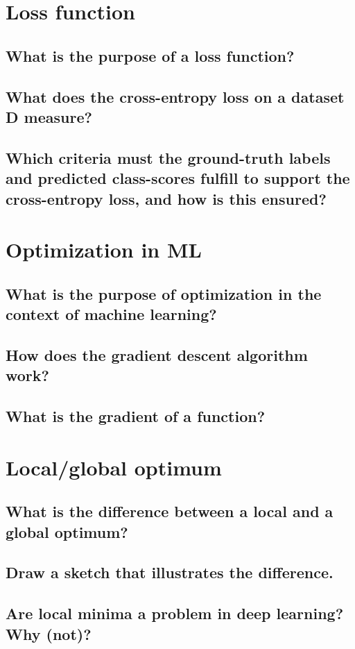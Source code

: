 \section{Loss function}
\subsection{What is the purpose of a loss function?}
\subsection{What does the cross-entropy loss on a dataset D measure?}
\subsection{Which criteria must the ground-truth labels and predicted class-scores fulfill to support the cross-entropy loss, and how is this ensured?}

\section{Optimization in ML}
\subsection{What is the purpose of optimization in the context of machine learning?}
\subsection{How does the gradient descent algorithm work?}
\subsection{What is the gradient of a function? }

\section{Local/global optimum}
\subsection{What is the difference between a local and a global optimum?}
\subsection{Draw a sketch that illustrates the difference.}
\subsection{Are local minima a problem in deep learning?  Why (not)?}


